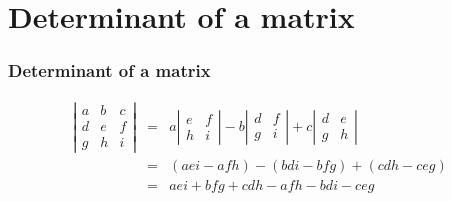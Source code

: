\documentclass[]{beamer}
\newcommand{\sect}[1]{
\section{#1}
\begin{frame}[fragile]\frametitle{#1}
}
\begin{document}
\sect{Determinant of a matrix}
\begin{eqnarray*}
\left|\begin{array}{ccc}a&b&c\\d&e&f\\g&h&i\end{array}\right|
&=&
a\left|\begin{array}{cc}e&f\\h&i\end{array}\right|
-b\left|\begin{array}{cc}d&f\\g&i\end{array}\right|
+c\left|\begin{array}{cc}d&e\\g&h\end{array}\right|\\
&=& (aei - afh) - (bdi - bfg) + (cdh - ceg)\\
&=& aei + bfg + cdh - afh - bdi - ceg
\end{eqnarray*}
\end{frame}
\end{document}
